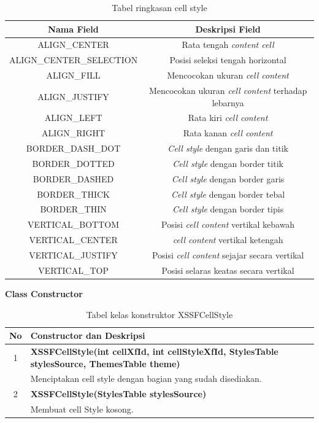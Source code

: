 \begin{table}[H]
		\centering
		\caption{Tabel ringkasan cell style}
		\label{tab:ringkasan_cell_style}
		
	
	\begin{tabular}{|c|c|}
		\hline
		\textbf{Nama Field} & \textbf{Deskripsi Field} \\ \hline \hline
		ALIGN\_CENTER & Rata tengah \textit{content cell}\\ \hline 
		ALIGN\_CENTER\_SELECTION &	Posisi seleksi tengah horizontal\\ \hline 
		ALIGN\_FILL & Mencocokan ukuran \textit{cell content} \\ \hline
		ALIGN\_JUSTIFY	&	Mencocokan ukuran \textit{cell content} terhadap lebarnya\\ \hline
		ALIGN\_LEFT	&	Rata kiri \textit{cell content}\\ \hline
		ALIGN\_RIGHT &	Rata kanan \textit{cell content}\\ \hline
		BORDER\_DASH\_DOT &	\textit{Cell style} dengan garis dan titik \\ \hline
		BORDER\_DOTTED &	\textit{Cell style} dengan border titik\\ \hline
		BORDER\_DASHED &	\textit{Cell style} dengan border garis\\ \hline
		BORDER\_THICK &	\textit{Cell style} dengan border tebal\\ \hline
		BORDER\_THIN &	\textit{Cell style} dengan border tipis\\ \hline
		VERTICAL\_BOTTOM &	Posisi \textit{cell content} vertikal kebawah\\ \hline
		VERTICAL\_CENTER & \textit{cell content} vertikal ketengah\\ \hline
		VERTICAL\_JUSTIFY &	Posisi \textit{cell content} sejajar secara vertikal \\ \hline
		VERTICAL\_TOP &	Posisi selaras keatas secara vertikal\\ \hline
	\end{tabular}
\end{table}

\noindent \textbf{Class Constructor}
\begin{table}[H]
		\centering
		\caption{Tabel kelas konstruktor XSSFCellStyle}
		\label{tab:konstrukXSSFCellStyle}
	\begin{tabular}{|c|p{15cm}|}
		\hline
		\textbf{No} & \textbf{Constructor dan Deskripsi} \\ \hline \hline
		1 & \textbf{XSSFCellStyle(int cellXfId, int cellStyleXfId, StylesTable stylesSource, ThemesTable theme)}\\
			&	Menciptakan cell style dengan bagian yang sudah disediakan.\\ \hline
		2 & \textbf{XSSFCellStyle(StylesTable stylesSource)}\\
			&	Membuat cell Style kosong.\\ \hline 	
	\end{tabular}
\end{table}

